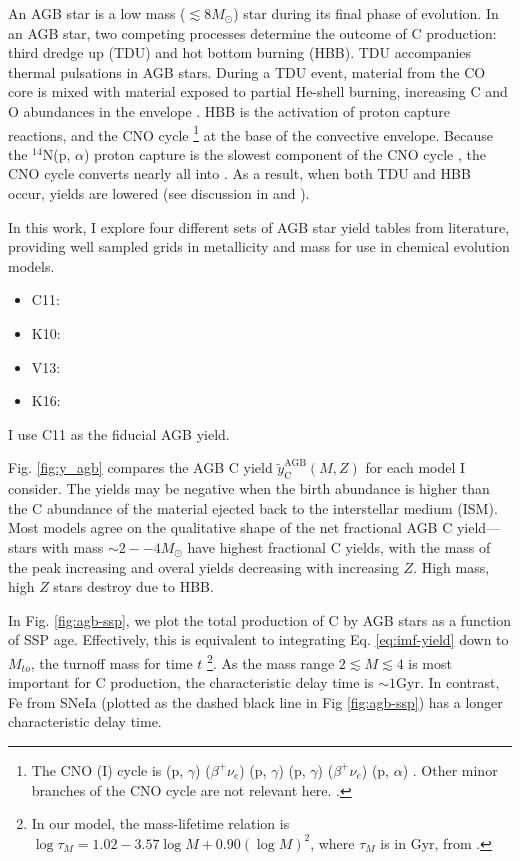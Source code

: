 \documentclass[12pt,oneside]{report}
\newcommand{\sun}{\ensuremath{\odot}}
\newcommand{\alp}{$\alpha$}
\begin{document}
An AGB star is a low mass ($\lesssim 8 M_{\sun}$) star during its final phase of evolution.  In an AGB star, two competing processes determine the outcome of C production: third dredge up (TDU) and hot bottom burning (HBB).  TDU accompanies thermal pulsations in AGB stars. During a TDU event, material from the CO core is mixed with material exposed to partial He-shell burning, increasing C and O abundances in the envelope \citep{KL14}.
HBB is the activation of proton capture reactions, and the CNO cycle%
\footnote{The CNO (I) cycle is
(p, $\gamma$)
($\beta^+ \nu_e$)
(p, $\gamma$)
(p, $\gamma$)
($\beta^{+}\nu_e$)
(p, \alp)
.
 Other minor branches of the CNO cycle are not relevant here.
 \citep{solar-fusion}.
}
at the base of the convective envelope. Because the $^{14}$N(p, $\alpha$) proton capture is the slowest component of the CNO cycle \citep{solar-fusion}, the CNO cycle converts nearly all  into .
As a result, when both TDU and HBB occur,  yields are lowered (see discussion in \citealt{james+22} and \citealt{ventura+13}).

In this work, I explore four different sets of AGB star yield tables from literature, providing well sampled grids in metallicity and mass for use in chemical evolution models. 
\begin{itemize}
    \item C11: \citet{cristallo+11, cristallo+15}
    \item K10: \citet{karakas10}
    \item V13: \citet{ventura+13,ventura+14,ventura+18}
    \item K16: \citet{KL16} \citet{karakas+18}
\end{itemize}
I use C11 as the fiducial AGB yield.


Fig. \ref{fig:y_agb} compares the AGB C yield $\tilde{y}_\text{C}^\text{AGB}(M, Z)$ for each model I consider. 
The yields may be negative when the birth abundance is higher than the C abundance of the material ejected back to the interstellar medium (ISM). 
Most models agree on the qualitative shape of the net fractional AGB C yield---%
stars with mass $\sim 2--4 M_\odot$ have highest fractional C yields, with the mass of the peak increasing and overal yields decreasing with increasing $Z$.  High mass, high $Z$ stars destroy  due to HBB.

In Fig. \ref{fig:agb-ssp}, we plot the total production of C by AGB stars as a function of SSP age.
Effectively, this is equivalent to integrating Eq. \ref{eq:imf-yield} down to $M_{to}$, the turnoff mass for time $t$%
\footnote{In our model, the mass-lifetime relation is
$\log \tau_M = 1.02 - 3.57\log M + 0.90 \left(\log M\right)^2$,
where $\tau_M$ is in Gyr,
from \citet{larson74}.}.
As the mass range $2\lesssim M \lesssim 4$ is most important for C production, the characteristic delay time is $\sim 1$Gyr. In contrast, Fe from SNeIa (plotted as the dashed black line in Fig \ref{fig:agb-ssp}) has a longer characteristic delay time.
\end{document}
